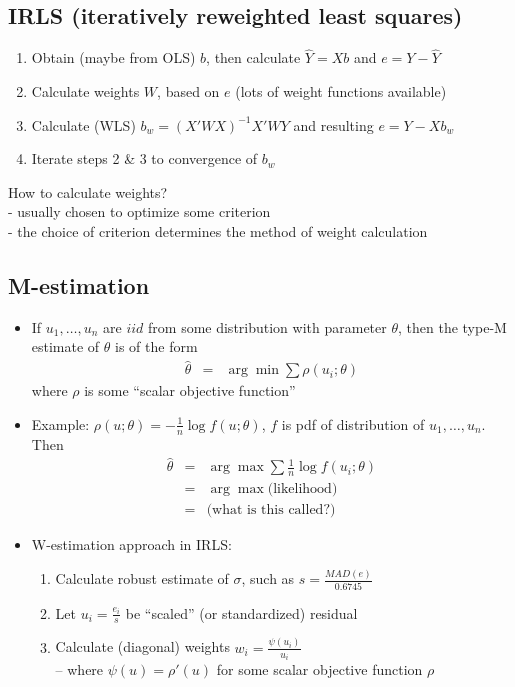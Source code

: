 \documentclass[12pt]{notes}
\begin{document}
\subsection{IRLS (iteratively reweighted least squares)}
\begin{enumerate}
  \item Obtain (maybe from OLS) ${b}$, then calculate $\hat{Y} = X b$
        and $e = Y - \hat{Y}$
  \item Calculate weights $W$, based on $e$
        (lots of weight functions available)
  \item Calculate (WLS) $b_w = (X' W X)^{-1} X' W Y$
        and resulting $e = Y - X b_w$
  \item Iterate steps 2 \& 3 to convergence of $b_w$
\end{enumerate}

How to calculate weights?\\
 - usually chosen to optimize some criterion\\
 - the choice of criterion determines the method of weight calculation

\subsection{M-estimation}
\begin{itemize}
\item If $u_1, \ldots, u_n$ are $iid$ from some distribution with
parameter $\theta$, then the type-M estimate of $\theta$ is of the
form
\begin{eqnarray}
  \hat{\theta} & = & \arg \min \sum \rho(u_i; \theta) \nonumber
\end{eqnarray}
where $\rho$ is some ``scalar
objective function''\\
\item
Example: $\rho(u; \theta) = - \frac{1}{n} \log f(u;\theta)$, $f$ is
pdf of distribution of $u_1, \ldots, u_n$. Then
\begin{eqnarray}
  \hat{\theta} & = & \arg \max \sum \frac{1}{n} \log f(u_i; \theta)
  \nonumber \\
  & = & \arg \max \mbox{(likelihood)} \nonumber \\
  & = & \mbox{(what is this called?)} \nonumber
\end{eqnarray}
\item W-estimation approach in IRLS:
\begin{enumerate}
  \item Calculate robust estimate of $\sigma$, such as $s =
  \frac{MAD(e)}{0.6745}$
  \item Let $u_i = \frac{e_i}{s}$ be ``scaled'' (or standardized) residual
  \item Calculate (diagonal) weights $w_i = \frac{\psi(u_i)}{u_i}$\\
   -- where   $\psi(u) = \rho'(u)$ for some scalar objective function $\rho$
\end{enumerate}
\end{itemize}
\end{document}
